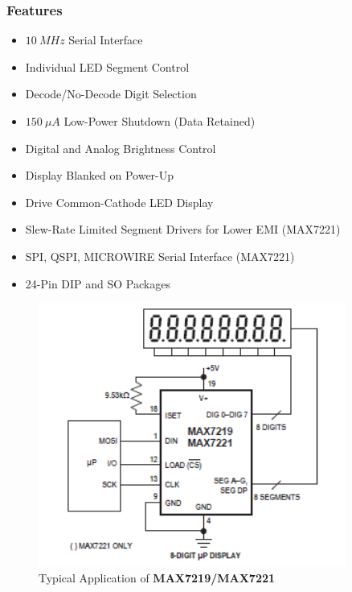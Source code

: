 \subsubsection*{Features}
\begin{itemize}
    \item $\SI{10}{MHz}$ Serial Interface
    \item Individual LED Segment Control
    \item Decode/No-Decode Digit Selection
    \item $\SI{150}{\mu A}$ Low-Power Shutdown (Data Retained)
    \item Digital and Analog Brightness Control
    \item Display Blanked on Power-Up
    \item Drive Common-Cathode LED Display
    \item Slew-Rate Limited Segment Drivers
for Lower EMI (MAX7221)
    \item SPI, QSPI, MICROWIRE Serial Interface (MAX7221)
    \item 24-Pin DIP and SO Packages
\end{itemize}

\begin{figure}[H]
    \centering
    \includegraphics[width=0.9\textwidth]{Files/Images/Max7219.png}
    \caption{Typical Application of \textbf{MAX7219/MAX7221}}
    \label{Max7219}
\end{figure}
